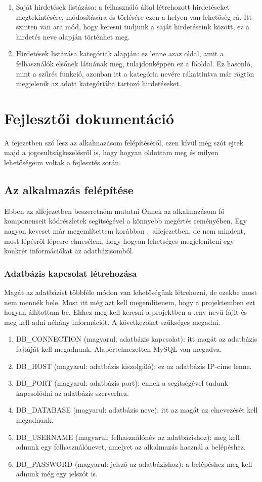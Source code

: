 \documentclass[]{thesis-ekf}
\theoremstyle{definition}
\theoremstyle{remark}
\begin{document}
\begin{enumerate}
			\item Saját hirdetések listázása: a felhasználó által létrehozott hirdetéseket megtekintésére, módosítására és törlésére ezen a helyen van lehetőség rá. Itt szinten van ara mód, hogy keresni tudjunk a saját hirdetéseink között, ez a hirdetés neve alapján történhet meg.
			\item Hirdetések listázása kategóriák alapján: ez lenne azaz oldal, amit a felhasználók elsőnek látnának meg, tulajdonképpen ez a főoldal. Ez hasonló, mint a szűrés funkció, azonban itt a kategória nevére rákattintva már rögtön megjelenik az adott kategóriába tartozó hirdetéseket.
		\end{enumerate}
	
	\chapter{Fejlesztői dokumentáció}
		A fejezetben szó lesz az alkalmazásom felépítéséről, ezen kívül még szót ejtek majd a jogosultságkezelésről is, hogy hogyan oldottam meg és milyen lehetőségeim voltak a fejlesztés során.
	\section{Az alkalmazás felépítése}
		Ebben az alfejezetben beszeretném mutatni Önnek az alkalmazásom fő komponenseit kódrészletek segítségével a könnyebb megértés reményében. Egy nagyon keveset már megemlítettem korábban .~alfejezetben, de nem mindent, most lépésről lépesre elmesélem, hogy hogyan lehetséges megjeleníteni egy konkrét információkat az adatbázisomból.
	\subsection{Adatbázis kapcsolat létrehozása}
		Magát az adatbázist többféle módon van lehetőségünk létrehozni, de ezekbe most nem mennék bele. Most itt még azt kell megemlítenem, hogy a projektemben ezt hogyan állítottam be. Ehhez meg kell keresni a projektben a .env nevű fájlt és meg kell adni néhány információt. A következőket szükséges megadni.
		\begin{enumerate}
			\item DB\_CONNECTION (magyarul: adatbázis kapcsolat): itt magát az adatbázis fajtáját kell megadnunk. Alapértelmezetten MySQL van megadva. 
			\item DB\_HOST (magyarul: adatbázis kiszolgáló): ez az adatbázis IP-címe lenne.
			\item DB\_PORT (magyarul: adatbázis port): ennek a segítségével tudunk kapcsolódni az adatbázis szerverhez. 
			\item DB\_DATABASE (magyarul: adatbázis neve): itt az magát az elnevezését kell megadnunk.
			\item DB\_USERNAME (magyarul: felhasználónév az adatbázishoz): meg kell adnunk egy felhasználónevet, amelyet az alkalmazás használ a belépéshez.
			\item DB\_PASSWORD (magyarul: jelszó az adatbázishoz): a belépéshez meg kell adnunk még egy jelszót is.
		\end{enumerate}
\end{document}
